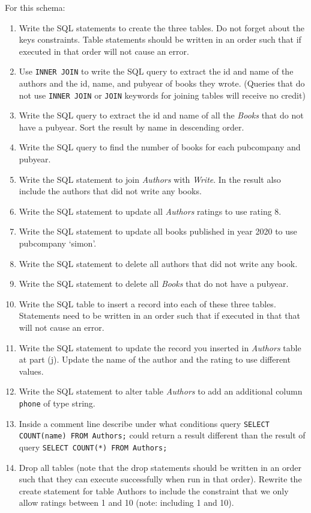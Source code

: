 \documentclass[letterpaper, 11pt]{article}
\begin{document}
For this schema:
\begin{enumerate}[label={\alph*})]
    \item Write the SQL statements to create the three tables. Do not forget about the keys constraints. Table statements should be written in an order such that if executed in that order will not cause an error. 
    \item Use \texttt{INNER JOIN} to write the SQL query to extract the id and name of the authors and the id, name, and pubyear of books they wrote. (Queries that do not use \texttt{INNER JOIN} or \texttt{JOIN} keywords for joining tables will receive no credit)
    \item Write the SQL query to extract the id and name of all the \textit{Books} that do not have a pubyear. Sort the result by name in descending order.
    \item Write the SQL query to find the number of books for each pubcompany and pubyear.
    \item Write the SQL statement to join \textit{Authors} with \textit{Write}. In the result also include the authors that did not write any books.
    \item Write the SQL statement to update all \textit{Authors} ratings to use rating 8.
    \item Write the SQL statement to update all books published in year 2020 to use {pubcompany} `simon'.
    \item Write the SQL statement to delete all authors that did not write any book.
    \item Write the SQL statement to delete all \textit{Books} that do not have a pubyear.
    \item Write the SQL table to insert a record into each of these three tables. Statements need to be written in an order such that if executed in that that will not cause an error.
    \item Write the SQL statement to update the record you inserted in \textit{Authors} table at part (j). Update the name of the author and the rating to use different values.
    \item Write the SQL statement to alter table \textit{Authors} to add an additional column \texttt{phone} of type string.
    \item Inside a comment line describe under what conditions query \texttt{SELECT COUNT(name) FROM Authors;} could return a result different than the result of query \texttt{SELECT COUNT(*) FROM Authors;}
    \item Drop all tables (note that the drop statements should be written in an order such that they can execute successfully when run in that order). Rewrite the create statement for table Authors to include the constraint that we only allow ratings between 1 and 10 (note: including 1 and 10). 
\end{enumerate}
\end{document}
